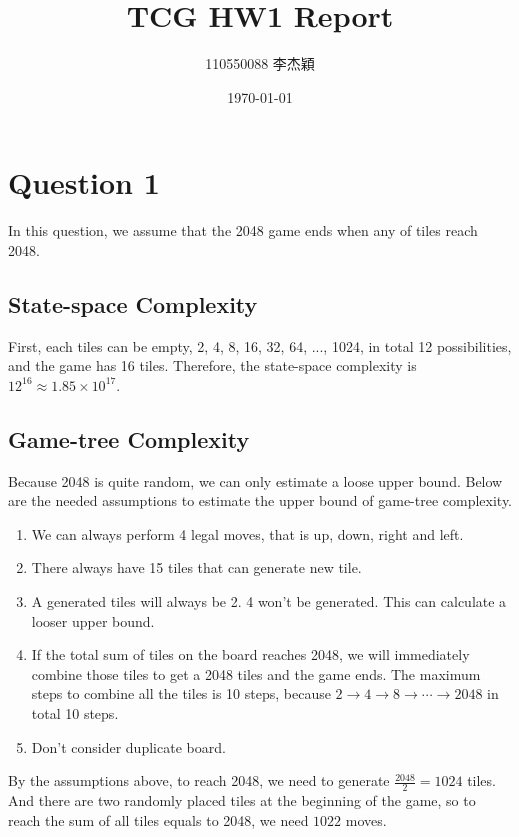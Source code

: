 \documentclass{article}[12pt]
\title{TCG HW1 Report}
\author{110550088 李杰穎}
\date{\today}
\begin{document}
\maketitle

\section{Question 1}

In this question, we assume that the 2048 game ends when any of tiles reach 2048.

\subsection{State-space Complexity}
First, each tiles can be empty, 2, 4, 8, 16, 32, 64, ..., 1024, in total 12 possibilities, and the game has 16 tiles. Therefore, the state-space complexity is ${12}^{16} \approx 1.85 \times {10}^{17}$.

\subsection{Game-tree Complexity}

Because 2048 is quite random, we can only estimate a loose upper bound. Below are the needed assumptions to estimate the upper bound of game-tree complexity.

\begin{enumerate}
	\item We can always perform 4 legal moves, that is up, down, right and left.
	\item There always have 15 tiles that can generate new tile.
	\item A generated tiles will always be 2. 4 won't be generated. This can calculate a looser upper bound.
	\item If the total sum of tiles on the board reaches 2048, we will immediately combine those tiles to get a 2048 tiles and the game ends. The maximum steps to combine all the tiles is 10 steps, because $2 \rightarrow 4 \rightarrow 8 \rightarrow \cdots \rightarrow 2048$ in total 10 steps.
	\item Don't consider duplicate board.
\end{enumerate}

By the assumptions above, to reach 2048, we need to generate $\frac{2048}{2} = 1024$ tiles. And there are two randomly placed tiles at the beginning of the game, so to reach the sum of all tiles equals to 2048, we need $1022$ moves. 
\end{document}
